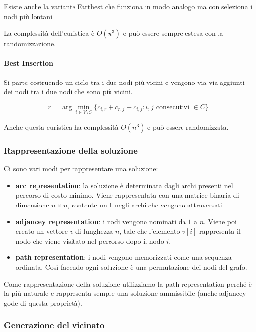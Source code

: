 Esiste anche la variante Farthest che funziona in modo analogo ma con seleziona i nodi più lontani

La complessità dell'euristica è $O(n^3)$ e può essere sempre estesa con la randomizzazione.

\paragraph{Best Insertion}

Si parte costruendo un ciclo tra i due nodi più vicini e vengono via via aggiunti dei nodi tra i due nodi che sono più vicini.

$$
r = \arg\min_{i \in V\setminus C}\{c_{i,r} +c_{r,j} - c_{i,j}: i,j \text{ consecutivi } \in C\}
$$

\noindent Anche questa euristica ha complessità $O(n^3)$ e può essere randomizzata.

\subsubsection{Rappresentazione della soluzione}

Ci sono vari modi per rappresentare una soluzione:

\begin{itemize}
	\item \textbf{arc representation}: la soluzione è determinata dagli archi presenti nel percorso di costo minimo. Viene rappresentata con una matrice binaria di dimensione $n\times n$, contente un 1 negli archi che vengono attraversati.
	\item \textbf{adjancey representation}: i nodi vengono nominati da $1$ a $n$. Viene poi creato un vettore $v$ di lunghezza $n$, tale che l'elemento $v[i]$ rappresenta il nodo che viene visitato nel percorso dopo il nodo $i$.
	\item \textbf{path representation}: i nodi vengono memorizzati come una sequenza ordinata. Così facendo ogni soluzione è una permutazione dei nodi del grafo.
\end{itemize}

\noindent Come rappresentazione della soluzione utilizziamo la path representation perché è la più naturale e rappresenta sempre una soluzione ammissibile (anche adjancey gode di questa proprietà).

\subsubsection{Generazione del vicinato}

